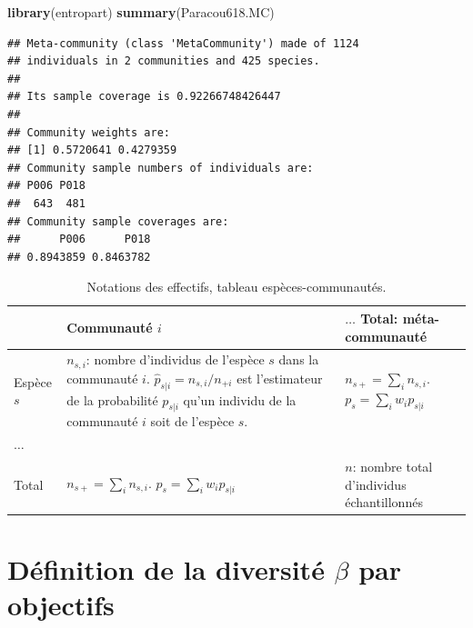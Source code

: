 \documentclass[
  11pt,
  french,
  a4paper,
  extrafontsizes,onecolumn,openright
  ]{memoir}
\newenvironment{Shaded}{\begin{snugshade}}{\end{snugshade}}
\newcommand{\FunctionTok}[1]{\textcolor[rgb]{0.13,0.29,0.53}{\textbf{#1}}}
\newcommand{\NormalTok}[1]{#1}
\begin{document}
\scriptsize

\begin{Shaded}
\begin{Highlighting}[]
\FunctionTok{library}\NormalTok{(entropart)}
\FunctionTok{summary}\NormalTok{(Paracou618.MC)}
\end{Highlighting}
\end{Shaded}

\begin{verbatim}
## Meta-community (class 'MetaCommunity') made of 1124 
## individuals in 2 communities and 425 species. 
## 
## Its sample coverage is 0.92266748426447 
## 
## Community weights are: 
## [1] 0.5720641 0.4279359
## Community sample numbers of individuals are: 
## P006 P018 
##  643  481 
## Community sample coverages are: 
##      P006      P018 
## 0.8943859 0.8463782
\end{verbatim}

\normalsize



\scriptsize

\begin{table}
\centering
\caption{\label{tab:Notations}Notations des effectifs, tableau espèces-communautés.}
\centering
\fontsize{9}{11}\selectfont
\begin{tabu} to 
\toprule
 & Communauté $i$ & $\dots$ Total: méta-communauté\\
\midrule
Espèce $s$ & $n_{s,i}$: nombre d'individus de l'espèce $s$ dans la communauté $i$. $\hat{p}_{s|i}=n_{s,i}/n_{+i}$ est l'estimateur de la probabilité $p_{s|i}$ qu'un individu de la communauté $i$ soit de l'espèce $s$. & $n_{s+}=\sum_i{n_{s,i}}$. $p_s=\sum_i{w_{i}p_{s|i}}$\\
$\dots$ &  & \\
Total & $n_{s+}=\sum_i{n_{s,i}}$. $p_s=\sum_i{w_{i}p_{s|i}}$ & $n$: nombre total d'individus échantillonnés\\
\bottomrule
\end{tabu}
\end{table}

\normalsize

\section{\texorpdfstring{Définition de la diversité \(\beta\) par objectifs}{Définition de la diversité \textbackslash beta par objectifs}}\label{duxe9finition-de-la-diversituxe9-beta-par-objectifs}
\end{document}
